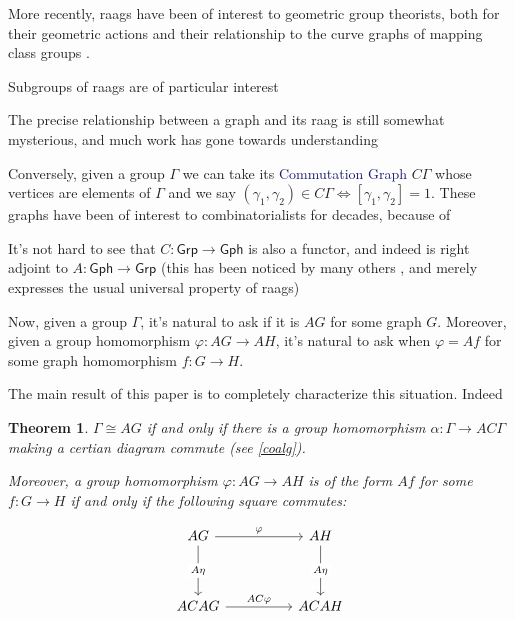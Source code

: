 \documentclass[12pt]{article}
\newtheorem{thm}{Theorem}
\theoremstyle{definition}
\theoremstyle{theorem}
\newcommand*{\important}[1]{\textcolor{MidnightBlue}{#1}}
\begin{document}
    More recently, raags have been of interest to geometric group theorists,
    both for their geometric actions 
    and their relationship to the curve graphs of mapping class groups
    .


    Subgroups of raags are of particular interest 

    The precise relationship between a graph and its raag is still somewhat
    mysterious, and much work has gone towards understanding 

    Conversely, given a group $\Gamma$ we can take its \important{Commutation Graph}
    $C\Gamma$ whose vertices are elements of $\Gamma$ and we say 
    $(\gamma_1, \gamma_2) \in C\Gamma \iff [\gamma_1, \gamma_2] = 1$.
    These graphs have been of interest to combinatorialists 
    for decades, because of 

    It's not hard to see that $C : \mathsf{Grp} \to \mathsf{Gph}$ is also a 
    functor, and indeed is right adjoint to $A : \mathsf{Gph} \to \mathsf{Grp}$
    (this has been noticed by many others , and merely 
    expresses the usual universal property of raags)

    Now, given a group $\Gamma$, it's natural to ask if it is $AG$ for some 
    graph $G$. Moreover, given a group homomorphism $\varphi : AG \to AH$, it's 
    natural to ask when $\varphi = Af$ for some graph homomorphism $f : G \to H$.

    The main result of this paper is to completely characterize this situation.
    Indeed

    \begin{thm}
        $\Gamma \cong AG$ if and only if there is a group homomorphism 
        $\alpha : \Gamma \to AC\Gamma$ making a certian diagram 
        commute (see \ref{coalg}).

        Moreover, a group homomorphism $\varphi : AG \to AH$ is of the form
        $Af$ for some $f : G \to H$ if and only if the following square commutes:

        \[
            \begin{tikzcd}
            AG && AH \\
            \\
            ACAG && ACAH
            \arrow["\varphi", from=1-1, to=1-3]
            \arrow["AC\varphi", from=3-1, to=3-3]
            \arrow["{A \eta}"{description}, from=1-1, to=3-1]
            \arrow["A\eta"{description}, from=1-3, to=3-3]
            \end{tikzcd}
        \]
    \end{thm}
\end{document}
